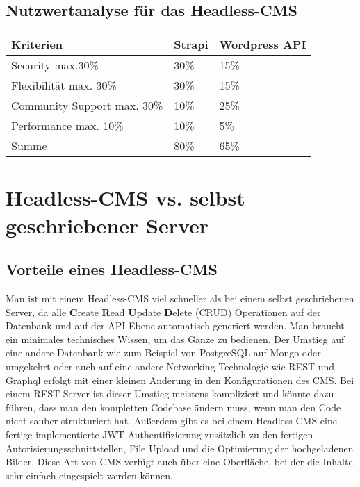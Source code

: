 \subsection{Nutzwertanalyse für das Headless-CMS}

\begin{tabular}{ |p{3cm}|p{3cm}|p{3cm}| }
    \hline
    Kriterien                   & Strapi & Wordpress API \\
    \hline
    Security max.30\%           & 30\%   & 15\%          \\
    \hline
    Flexibilität max. 30\%      & 30\%   & 15\%          \\
    \hline
    Community Support max. 30\% & 10\%   & 25\%          \\
    \hline
    Performance max. 10\%       & 10\%   & 5\%           \\
    \hline
    Summe                       & 80\%   & 65\%          \\
    \hline
\end{tabular}



\section{Headless-CMS vs. selbst geschriebener Server}

\subsection{Vorteile eines Headless-CMS}
Man ist mit einem Headless-CMS viel schneller als bei einem selbst geschriebenen Server,
da alle \textbf{C}reate \textbf{R}ead \textbf{U}pdate \textbf{D}elete (CRUD) Operationen auf der Datenbank und auf der API Ebene automatisch generiert werden. Man braucht ein minimales technisches Wissen, um das Ganze zu bedienen.
Der Umstieg auf eine andere Datenbank wie zum Beispiel von PostgreSQL auf Mongo oder umgekehrt
oder auch auf eine andere Networking Technologie wie REST und Graphql
erfolgt mit einer kleinen Änderung in den Konfigurationen des CMS.
Bei einem REST-Server ist dieser Umstieg meistens kompliziert und könnte dazu führen,
dass man den kompletten Codebase ändern muss, wenn man den Code nicht sauber strukturiert hat.
Außerdem gibt es bei einem Headless-CMS eine fertige implementierte JWT Authentifizierung
zusätzlich zu den fertigen Autorisierungsschnittstellen,
File Upload und die Optimierung der hochgeladenen Bilder.
Diese Art von CMS verfügt auch über eine Oberfläche,
bei der die Inhalte sehr einfach eingespielt werden können.

